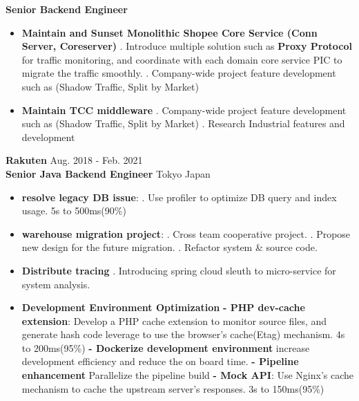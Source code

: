 \documentclass{res}
\begin{document}
\begin{resume}
                {\bf Senior Backend Engineer}
                \begin{itemize}
                    \item \textbf{Maintain and Sunset Monolithic Shopee Core Service (Conn Server, Coreserver)}
                    . Introduce multiple solution such as \textbf{Proxy Protocol} for traffic monitoring, and coordinate with each domain core service PIC to migrate the traffic smoothly. 
                    . Company-wide project feature development such as (Shadow Traffic, Split by Market)
                    \item \textbf{Maintain TCC middleware}
                    . Company-wide project feature development such as (Shadow Traffic, Split by Market)
                    . Research Industrial features and development
                \end{itemize}



				{\hfill{\bf Rakuten}\hspace{4.6cm}  Aug. 2018 - Feb. 2021}\\
				{\bf Senior Java Backend Engineer}   {\hfill Tokyo Japan}
				\begin{itemize}
                   
					\item \textbf{resolve legacy DB issue}: 
					    . Use profiler to optimize DB query and index usage. 5s to 500ms(90\%)
					\item \textbf{warehouse migration project}: 
					    . Cross team cooperative project. 
					    . Propose new design for the future migration. 
					    . Refactor system & source code.
				    \item \textbf{Distribute tracing}
				        . Introducing spring cloud sleuth to micro-service for system analysis.
				    
				    \item \textbf{Development Environment Optimization}
					\subitem \textbf{- PHP dev-cache extension}: Develop a PHP cache extension to monitor source files, and generate hash code leverage to use the browser's cache(Etag) mechanism. 4s to 200ms(95\%)
					\subitem \textbf{- Dockerize development environment} increase development efficiency and reduce the on board time.
					\subitem \textbf{- Pipeline enhancement} Parallelize the pipeline build
					\subitem \textbf{- Mock API}: Use Nginx's cache mechanism to cache the upstream server's responses. 3s to 150ms(95\%)
				    

\end{itemize}
\end{resume}
\end{document}
